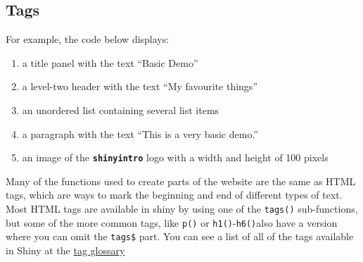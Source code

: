 \documentclass[
  oneside]{book}
\newenvironment{Shaded}{\begin{snugshade}}{\end{snugshade}}
\newcommand{\AttributeTok}[1]{\textcolor[rgb]{0.77,0.63,0.00}{#1}}
\newcommand{\FunctionTok}[1]{\textcolor[rgb]{0.00,0.00,0.00}{#1}}
\newcommand{\NormalTok}[1]{#1}
\newcommand{\OtherTok}[1]{\textcolor[rgb]{0.56,0.35,0.01}{#1}}
\newcommand{\SpecialCharTok}[1]{\textcolor[rgb]{0.00,0.00,0.00}{#1}}
\newcommand{\StringTok}[1]{\textcolor[rgb]{0.31,0.60,0.02}{#1}}
\providecommand{\tightlist}{%
  \setlength{\itemsep}{0pt}\setlength{\parskip}{0pt}}
\begin{document}
\hypertarget{tags}{%
\subsection{Tags}\label{tags}}

For example, the code below displays:

\begin{enumerate}
\def\labelenumi{\arabic{enumi}.}
\tightlist
\item
  a title panel with the text ``Basic Demo''
\item
  a level-two header with the text ``My favourite things''
\item
  an unordered list containing several list items
\item
  a paragraph with the text ``This is a very basic demo.''
\item
  an image of the \textbf{\texttt{shinyintro}} logo with a width and height of 100 pixels
\end{enumerate}

\begin{Shaded}
\end{Shaded}

Many of the functions used to create parts of the website are the same as HTML tags, which are ways to mark the beginning and end of different types of text. Most HTML tags are available in shiny by using one of the \texttt{tags}\texttt{()} sub-functions, but some of the more common tags, like \texttt{p}\texttt{()} or \texttt{h1}\texttt{()}-\texttt{h6}\texttt{()}also have a version where you can omit the \texttt{tags\$} part. You can see a list of all of the tags available in Shiny at the \href{https://shiny.rstudio.com/articles/tag-glossary.html}{tag glossary}
\end{document}
